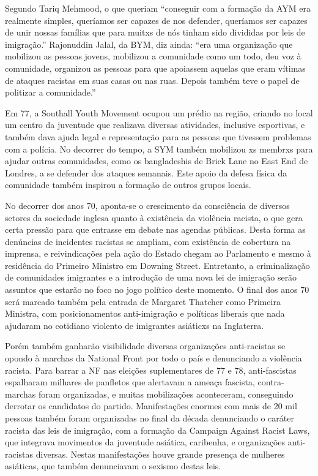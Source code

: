 Segundo Tariq Mehmood, o que queriam “conseguir com a formação da AYM era realmente simples, queríamos ser capazes de nos defender, queríamos ser capazes de unir nossas famílias que para muitxs de nós tinham sido divididas por leis de imigração.” Rajonuddin Jalal, da BYM, diz ainda: “era uma organização que mobilizou as pessoas jovens, mobilizou a comunidade como um todo, deu voz à comunidade, organizou as pessoas para que apoiassem aquelas que eram vítimas de ataques racistas em suas casas ou nas ruas. Depois também teve o papel de politizar a comunidade.”

Em 77, a Southall Youth Movement ocupou um prédio na região, criando no local um centro da juventude que realizava diversas atividades, inclusive esportivas, e também dava ajuda legal e representação para as pessoas que tivessem problemas com a polícia. No decorrer do tempo, a SYM também mobilizou xs membrxs para ajudar outras comunidades, como os bangladeshis de Brick Lane no East End de Londres, a se defender dos ataques semanais. Este apoio da defesa física da comunidade também inspirou a formação de outros grupos locais.

No decorrer dos anos 70, aponta-se o crescimento da consciência de diversos setores da sociedade inglesa quanto à existência da violência racista, o que gera certa pressão para que entrasse em debate nas agendas públicas. Desta forma as denúncias de incidentes racistas se ampliam, com existência de cobertura na imprensa, e reivindicações pela ação do Estado chegam ao Parlamento e mesmo à residência do Primeiro Ministro em Downing Street. Entretanto, a criminalização de comunidades imigrantes e a introdução de uma nova lei de imigração serão assuntos que estarão no foco no jogo político deste momento. O final dos anos 70 será marcado também pela entrada de Margaret Thatcher como Primeira Ministra, com posicionamentos anti-imigração e políticas liberais que nada ajudaram no cotidiano violento de imigrantes asiáticxs na Inglaterra.

Porém também ganharão visibilidade diversas organizações anti-racistas se opondo à marchas da National Front por todo o país e denunciando a violência racista. Para barrar a NF nas eleições suplementares de 77 e 78, anti-fascistas espalharam milhares de panfletos que alertavam a ameaça fascista, contra-marchas foram organizadas, e muitas mobilizações aconteceram, conseguindo derrotar os candidatos do partido. Manifestações enormes com mais de 20 mil pessoas também foram organizadas no final da década denunciando o caráter racista das leis de imigração, com a formação da Campaign Against Racist Laws, que integrava movimentos da juventude asiática, caribenha, e organizações anti-racistas diversas. Nestas manifestações houve grande presença de mulheres asiáticas, que também denunciavam o sexismo destas leis.

